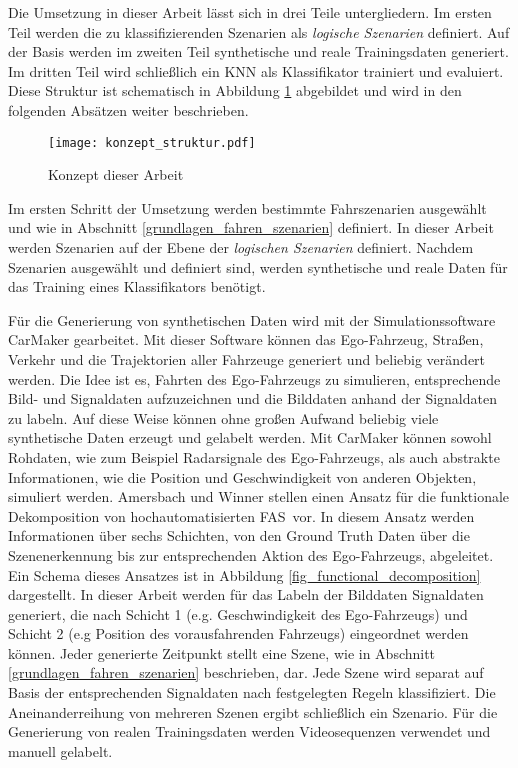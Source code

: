 Die Umsetzung in dieser Arbeit lässt sich in drei Teile untergliedern. Im ersten Teil werden die zu klassifizierenden Szenarien als \textit{logische Szenarien} definiert. Auf der Basis werden im zweiten Teil synthetische und reale Trainingsdaten generiert. Im dritten Teil wird schließlich ein \ac{KNN} als Klassifikator trainiert und evaluiert. Diese Struktur ist schematisch in Abbildung \ref{fig_konzept_struktur} abgebildet und wird in den folgenden Absätzen weiter beschrieben.

\begin{figure}[h]
\centering
\texttt{[image: konzept\_struktur.pdf]}
\caption{Konzept dieser Arbeit}
\label{fig_konzept_struktur}
\end{figure}

Im ersten Schritt der Umsetzung werden bestimmte Fahrszenarien ausgewählt und wie in Abschnitt \ref{grundlagen_fahren_szenarien} definiert. In dieser Arbeit werden Szenarien auf der Ebene der \textit{logischen Szenarien} definiert. Nachdem Szenarien ausgewählt und definiert sind, werden synthetische und reale Daten für das Training eines Klassifikators benötigt.

Für die Generierung von synthetischen Daten wird mit der Simulationssoftware CarMaker gearbeitet. Mit dieser Software können das Ego-Fahrzeug, Straßen, Verkehr und die Trajektorien aller Fahrzeuge generiert und beliebig verändert werden. Die Idee ist es, Fahrten des Ego-Fahrzeugs zu simulieren, entsprechende Bild- und Signaldaten aufzuzeichnen und die Bilddaten anhand der Signaldaten zu labeln. Auf diese Weise können ohne großen Aufwand beliebig viele synthetische Daten erzeugt und gelabelt werden. Mit CarMaker können sowohl Rohdaten, wie zum Beispiel Radarsignale des Ego-Fahrzeugs, als auch abstrakte Informationen, wie die Position und Geschwindigkeit von anderen Objekten, simuliert werden. Amersbach und Winner \cite{amersbach2017functional} stellen einen Ansatz für die funktionale Dekomposition von hochautomatisierten \ac{FAS} vor. In diesem Ansatz werden Informationen über sechs Schichten, von den Ground Truth Daten über die Szenenerkennung bis zur entsprechenden Aktion des Ego-Fahrzeugs, abgeleitet. Ein Schema dieses Ansatzes ist in Abbildung \ref{fig_functional_decomposition} dargestellt. In dieser Arbeit werden für das Labeln der Bilddaten Signaldaten generiert, die nach Schicht 1 (e.g. Geschwindigkeit des Ego-Fahrzeugs) und Schicht 2 (e.g Position des vorausfahrenden Fahrzeugs) eingeordnet werden können. Jeder generierte Zeitpunkt stellt eine Szene, wie in Abschnitt \ref{grundlagen_fahren_szenarien} beschrieben, dar. Jede Szene wird separat auf Basis der entsprechenden Signaldaten nach festgelegten Regeln klassifiziert. Die Aneinanderreihung von mehreren Szenen ergibt schließlich ein Szenario. Für die Generierung von realen Trainingsdaten werden Videosequenzen verwendet und manuell gelabelt.

